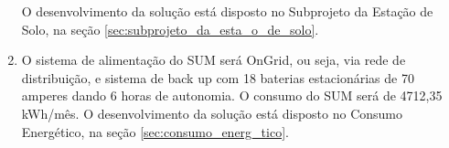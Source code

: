 \begin{enumerate}
	O desenvolvimento da solução está disposto no Subprojeto da Estação de Solo, na seção \ref{sec:subprojeto_da_esta_o_de_solo}.

\item O sistema de alimentação do SUM será OnGrid, ou seja, via rede de distribuição, e sistema de back up com 18 baterias estacionárias de 70 amperes dando 6 horas de autonomia.  O consumo do SUM será de 4712,35 kWh/mês. O desenvolvimento da solução está disposto no Consumo Energético, na seção \ref{sec:consumo_energ_tico}.

\end{enumerate}
